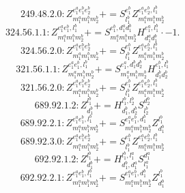\documentclass[letterpaper,10pt,fleqn,leqno,onecolumn]{article}
\begin{document}
\begin{equation} \;\;\;\;\;\;  249.48.2.0: Z^{e_{1}^{a}e_{1}^{b}e_{2}^{b}}_{m_{1}^{a}m_{1}^{b}m_{2}^{b}}+=S^{e_{1}^{b}}_{l_{1}^{b}}Z^{e_{1}^{a}e_{2}^{b},l_{1}^{b}}_{m_{1}^{a}m_{1}^{b}m_{2}^{b}} \end{equation}
\begin{equation} \;\;\;\;\;\;  324.56.1.1: Z^{e_{1}^{a}e_{1}^{b},l_{1}^{b}}_{m_{1}^{a}m_{1}^{b}m_{2}^{b}}+=S^{e_{1}^{b},d_{1}^{a}d_{1}^{b}}_{m_{1}^{a}m_{1}^{b}m_{2}^{b}}H^{e_{1}^{a},l_{1}^{b}}_{d_{1}^{a}d_{1}^{b}}\cdot -1. \end{equation}
\begin{equation} \;\;\;\;\;\;  324.56.2.0: Z^{e_{1}^{a}e_{1}^{b}e_{2}^{b}}_{m_{1}^{a}m_{1}^{b}m_{2}^{b}}+=S^{e_{1}^{b}}_{l_{1}^{b}}Z^{e_{1}^{a}e_{2}^{b},l_{1}^{b}}_{m_{1}^{a}m_{1}^{b}m_{2}^{b}} \end{equation}
\begin{equation} \;\;\;\;\;\;  321.56.1.1: Z^{e_{1}^{a}e_{1}^{b},l_{1}^{b}}_{m_{1}^{a}m_{1}^{b}m_{2}^{b}}+=S^{e_{1}^{a},d_{1}^{b}d_{2}^{b}}_{m_{1}^{a}m_{1}^{b}m_{2}^{b}}H^{e_{1}^{b},l_{1}^{b}}_{d_{1}^{b}d_{2}^{b}} \end{equation}
\begin{equation} \;\;\;\;\;\;  321.56.2.0: Z^{e_{1}^{a}e_{1}^{b}e_{2}^{b}}_{m_{1}^{a}m_{1}^{b}m_{2}^{b}}+=S^{e_{1}^{b}}_{l_{1}^{b}}Z^{e_{1}^{a}e_{2}^{b},l_{1}^{b}}_{m_{1}^{a}m_{1}^{b}m_{2}^{b}} \end{equation}
\begin{equation} \;\;\;\;\;\;  689.92.1.2: Z^{l_{1}^{b}}_{d_{1}^{b}}+=H^{l_{1}^{b},l_{2}^{b}}_{d_{1}^{b},d_{2}^{b}}S^{d_{2}^{b}}_{l_{2}^{b}} \end{equation}
\begin{equation} \;\;\;\;\;\;  689.92.2.1: Z^{e_{1}^{a}e_{1}^{b},l_{1}^{b}}_{m_{1}^{a}m_{1}^{b}m_{2}^{b}}+=S^{e_{1}^{a}e_{1}^{b},d_{1}^{b}}_{m_{1}^{a}m_{1}^{b}m_{2}^{b}}Z^{l_{1}^{b}}_{d_{1}^{b}} \end{equation}
\begin{equation} \;\;\;\;\;\;  689.92.3.0: Z^{e_{1}^{a}e_{1}^{b}e_{2}^{b}}_{m_{1}^{a}m_{1}^{b}m_{2}^{b}}+=S^{e_{1}^{b}}_{l_{1}^{b}}Z^{e_{1}^{a}e_{2}^{b},l_{1}^{b}}_{m_{1}^{a}m_{1}^{b}m_{2}^{b}} \end{equation}
\begin{equation} \;\;\;\;\;\;  692.92.1.2: Z^{l_{1}^{b}}_{d_{1}^{b}}+=H^{l_{1}^{b},l_{1}^{a}}_{d_{1}^{b},d_{1}^{a}}S^{d_{1}^{a}}_{l_{1}^{a}} \end{equation}
\begin{equation} \;\;\;\;\;\;  692.92.2.1: Z^{e_{1}^{a}e_{1}^{b},l_{1}^{b}}_{m_{1}^{a}m_{1}^{b}m_{2}^{b}}+=S^{e_{1}^{a}e_{1}^{b},d_{1}^{b}}_{m_{1}^{a}m_{1}^{b}m_{2}^{b}}Z^{l_{1}^{b}}_{d_{1}^{b}} \end{equation}
\end{document}
